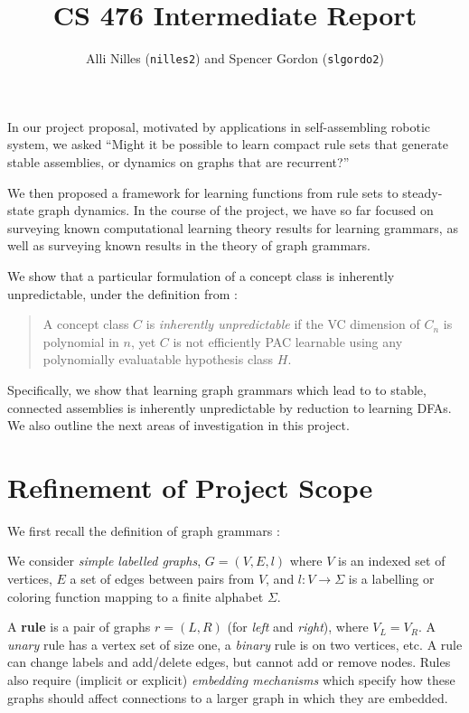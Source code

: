 \documentclass[]{article}
\title{CS 476 Intermediate Report}
\author{Alli Nilles (\texttt{nilles2}) and Spencer Gordon (\texttt{slgordo2})}
\date{}
\begin{document}
\maketitle

\newcommand{\step}[1]{\xrightarrow{#1}}
\newcommand{\steps}[1]{\xRightarrow{#1}}

In our project proposal, motivated by applications in self-assembling
robotic system, we asked ``Might it be possible to learn compact rule
sets that generate stable assemblies, or dynamics on graphs that are
recurrent?''

We then proposed a framework for learning functions from rule sets to
steady-state graph dynamics. In the course of the project, we have so
far focused on surveying known computational learning theory results for
learning grammars, as well as surveying known results in the theory of
graph grammars.

We show that a particular formulation of a concept class is inherently
unpredictable, under the definition from \cite{kearns1994}:

\begin{quote}
A concept class \(C\) is \emph{inherently unpredictable} if the VC
dimension of \(C_n\) is polynomial in \(n\), yet \(C\) is not
efficiently PAC learnable using any polynomially evaluatable hypothesis
class \(H\).
\end{quote}

Specifically, we show that learning graph grammars which lead to to
stable, connected assemblies is inherently unpredictable by reduction to
learning DFAs. We also outline the next areas of investigation in this
project.

\section{Refinement of Project
Scope}\label{refinement-of-project-scope}

We first recall the definition of graph grammars \cite{litovsky}
\cite{klavins}:

We consider \emph{simple labelled graphs}, \(G = (V,E,l)\) where \(V\)
is an indexed set of vertices, \(E\) a set of edges between pairs from
\(V\), and \(l: V \to \Sigma\) is a labelling or coloring function mapping to a
finite alphabet $\Sigma$.

A \textbf{rule} is a pair of graphs \(r=(L,R)\) (for \emph{left} and
\emph{right}), where \(V_L = V_R\). A \emph{unary} rule has a vertex set
of size one, a \emph{binary} rule is on two vertices, etc. A rule can
change labels and add/delete edges, but cannot add or remove nodes.
Rules also require (implicit or explicit) \emph{embedding mechanisms}
which specify how these graphs should affect connections to a larger
graph in which they are embedded.
\end{document}
